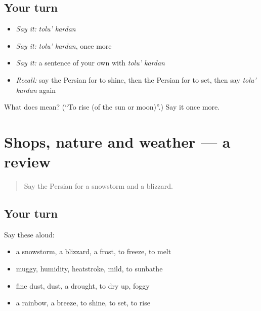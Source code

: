 \subsection*{Your turn}
\begin{itemize}
\raggedright
  \item \emph{Say it:} \emph{tolu' kardan}
  \item \emph{Say it:} \emph{tolu' kardan}, once more
  \item \emph{Say it:} a sentence of your own with \emph{tolu' kardan}
  \item \emph{Recall:} say the Persian for to shine, then the Persian for to set, then say \emph{tolu' kardan} again
\end{itemize}

\begin{tcolorbox}[breakable,colback=teal!4,colframe=teal!35!black,title={Before you move on}]
What does   mean? (\textquotedblleft{}To rise (of the sun or moon)\textquotedblright{}.) Say it once more.
\end{tcolorbox}
\section[(dialogue)]{Shops, nature and weather — a review}

\label{lesson:FA-R479-review-476-479}



\begin{quote}
Say the Persian for a snowstorm and a blizzard.
\end{quote}

\subsection*{Your turn}
Say these aloud:

\begin{itemize}
\raggedright
  \item a snowstorm, a blizzard, a frost, to freeze, to melt
  \item muggy, humidity, heatstroke, mild, to sunbathe
  \item fine dust, dust, a drought, to dry up, foggy
  \item a rainbow, a breeze, to shine, to set, to rise
\end{itemize}

